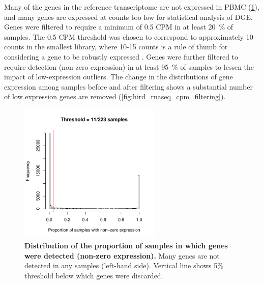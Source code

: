 Many of the genes in the reference transcriptome are not expressed in \gls{PBMC} (\cref{fig:hird_rnaseq_filtering_zeroProp}), and many genes are expressed at counts too low for statistical analysis of \gls{DGE}.
Genes were filtered to require a minimum of 0.5 \gls{CPM} in at least \SI{20}{\percent} of samples.
The 0.5 \gls{CPM} threshold was chosen to correspond to approximately 10 counts in the smallest library, where 10-15 counts is a rule of thumb for considering a gene to be robustly expressed \autocite{chen2016ReadsGenesPathways,law2018RNAseqAnalysisEasy}.
Genes were further filtered to require detection (non-zero expression) in at least \SI{95}{\percent} of samples to lessen the impact of low-expression outliers.
The change in the distributions of gene expression among samples before and after filtering shows a substantial number of low expression genes are removed (\cref{fig:hird_rnaseq_cpm_filtering}).

\begin{figure}
    \centering
    \includegraphics[width=0.6\textwidth, page=1]{mainmatter/figures/chapter_02/rnaseq_data_setup.gene_zero_prop.pdf}
    \caption{
        \textbf{Distribution of the proportion of samples in which genes were detected (non-zero expression).}
        Many genes are not detected in any samples (left-hand side). 
        Vertical line shows 5\% threshold below which genes were discarded.
    }
    \label{fig:hird_rnaseq_filtering_zeroProp}
\end{figure}

